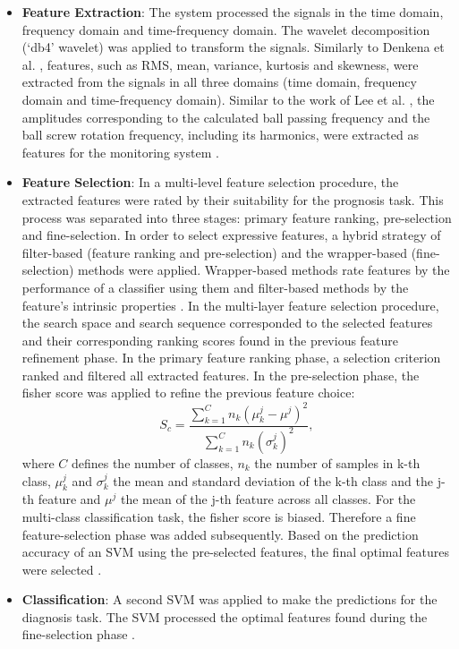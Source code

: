 \begin{itemize}
    \item \textbf{Feature Extraction}: The system processed the signals in the time domain, frequency domain and time-frequency domain. The wavelet decomposition (‘db4’ wavelet) was applied to transform the signals. Similarly to Denkena et al. \cite{Denkena2021}, features, such as RMS, mean, variance, kurtosis and skewness, were extracted from the signals in all three domains (time domain, frequency domain and time-frequency domain). Similar to the work of Lee et al. \cite{Lee2015}, the amplitudes corresponding to the calculated ball passing frequency and the ball screw rotation frequency, including its harmonics, were extracted as features for the monitoring system \cite{LiPin2018}.
    \item \textbf{Feature Selection}: In a multi-level feature selection procedure, the extracted features were rated by their suitability for the prognosis task. This process was separated into three stages: primary feature ranking, pre-selection and fine-selection. In order to select expressive features, a hybrid strategy of filter-based (feature ranking and pre-selection) and the wrapper-based (fine-selection) methods were applied. Wrapper-based methods rate features by the performance of a classifier using them and filter-based methods by the feature's intrinsic properties \cite{Wald2013}. In the multi-layer feature selection procedure, the search space and search sequence corresponded to the selected features and their corresponding ranking scores found in the previous feature refinement phase. In the primary feature ranking phase, a selection criterion ranked and filtered all extracted features. In the pre-selection phase, the fisher score was applied to refine the previous feature choice:
    \begin{equation}
        S_{c} = \frac{\sum_{k=1}^{C} n_{k}(\mu_{k}^{j}-\mu^{j})^{2}}{\sum_{k=1}^{C}n_{k}(\sigma_{k}^{j})^{2}},
    \end{equation}
    where $C$ defines the number of classes, $n_{k}$ the number of samples in k-th class, $\mu_{k}^{j}$ and $\sigma_{k}^{j}$ the mean and standard deviation of the k-th class and the j-th feature and $\mu^{j}$ the mean of the j-th feature across all classes. For the multi-class classification task, the fisher score is biased. Therefore a fine feature-selection phase was added subsequently. Based on the prediction accuracy of an SVM using the pre-selected features, the final optimal features were selected \cite{LiPin2018}.
    \item \textbf{Classification}: A second SVM was applied to make the predictions for the diagnosis task. The SVM processed the optimal features found during the fine-selection phase \cite{LiPin2018}. 
\end{itemize}

